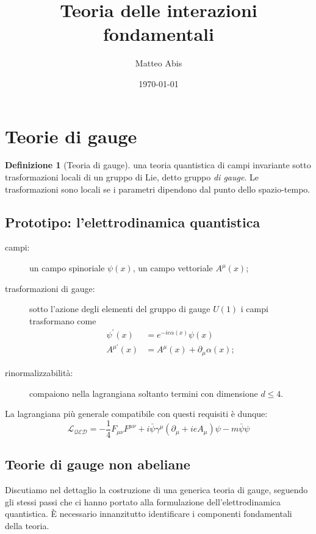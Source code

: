 \documentclass[italian,a4paper]{article}
\title{Teoria delle interazioni fondamentali}
\author{Matteo Abis}
\date{\today}
\theoremstyle{definition}
\newtheorem*{definition}{Definizione}
\newcommand{\dimu}{\ensuremath{\partial_{\mu}}}
\renewcommand{\leq}{\leqslant}
\begin{document}
\maketitle
\tableofcontents

\section{Teorie di gauge}
\begin{definition}[Teoria di gauge] una teoria quantistica di campi
    invariante sotto trasformazioni locali di un gruppo di Lie, detto gruppo
    \emph{di gauge}. Le trasformazioni sono locali se i parametri dipendono
    dal punto dello spazio-tempo.
\end{definition}

\subsection{Prototipo: l'elettrodinamica quantistica}
\begin{description}
    \item[campi:] un campo spinoriale $\psi(x)$, un campo vettoriale
        $A^{\mu}(x)$;
    \item[trasformazioni di gauge:] sotto l'azione degli elementi del gruppo
        di gauge $U(1)$ i campi trasformano come
        \begin{align*}
            \psi^\prime(x) &= e^{-ie\alpha(x)}\psi(x)\\
            A^{\mu\prime}(x) &= A^{\mu}(x) + \dimu \alpha(x);
        \end{align*}
    \item[rinormalizzabilit\`a:] compaiono nella lagrangiana soltanto
        termini con dimensione $d \leq 4$.
\end{description}

La lagrangiana pi\`u generale compatibile con questi requisiti \`e dunque:
\begin{equation*}
    \mathscr{L_{\text{QED}}} = -\dfrac{1}{4}F_{\mu\nu}F^{\mu\nu} + i
    \bar{\psi}\gamma^{\mu}(\dimu + i e A_{\mu})\psi - m
    \bar{\psi}\psi
\end{equation*}

\subsection{Teorie di gauge non abeliane}\label{teorie_di_gauge}
Discutiamo nel dettaglio la costruzione di una generica teoria di gauge,
seguendo gli stessi passi che ci hanno portato alla formulazione
dell'elettrodinamica quantistica. \`E necessario innanzitutto identificare i
componenti fondamentali della teoria.
\end{document}
